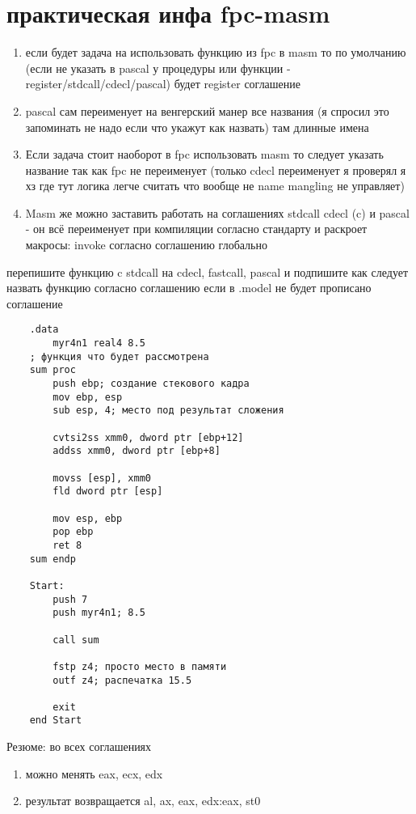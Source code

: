 \documentclass[a4paper,10pt]{article}
\begin{document}
\section*{практическая инфа fpc-masm}
\begin{enumerate}
    \item если будет задача на использовать функцию из fpc в masm то по умолчанию (если не указать в pascal у процедуры или функции - register/stdcall/cdecl/pascal) будет register соглашение
    \item pascal сам переименует на венгерский манер все названия (я спросил это запоминать не надо если что укажут как назвать) там длинные имена
    \item Если задача стоит наоборот в fpc использовать masm то следует указать название так как fpc не переименует (только cdecl переименует я проверял я хз где тут логика легче считать что вообще не name mangling не управляет)
    \item Masm же можно заставить работать на соглашениях stdcall cdecl (c) и pascal - он всё переименует при компиляции согласно стандарту и раскроет макросы: invoke согласно соглашению глобально
\end{enumerate}
перепишите функцию c stdcall на cdecl, fastcall, pascal и подпишите как следует назвать функцию согласно соглашению если в .model не будет прописано соглашение
\begin{verbatim}
    .data 
        myr4n1 real4 8.5
    ; функция что будет рассмотрена
    sum proc
        push ebp; создание стекового кадра
        mov ebp, esp
        sub esp, 4; место под результат сложения
    
        cvtsi2ss xmm0, dword ptr [ebp+12]
        addss xmm0, dword ptr [ebp+8]
    
        movss [esp], xmm0
        fld dword ptr [esp]
    
        mov esp, ebp
        pop ebp
        ret 8
    sum endp
    
    Start:
        push 7
        push myr4n1; 8.5
    
        call sum
    
        fstp z4; просто место в памяти
        outf z4; распечатка 15.5
    
        exit
    end Start
\end{verbatim}
\newpage
Резюме:
во всех соглашениях 
\begin{enumerate}
    \item можно менять eax, ecx, edx
    \item результат возвращается al, ax, eax, edx:eax, st0
\end{enumerate}
\end{document}

